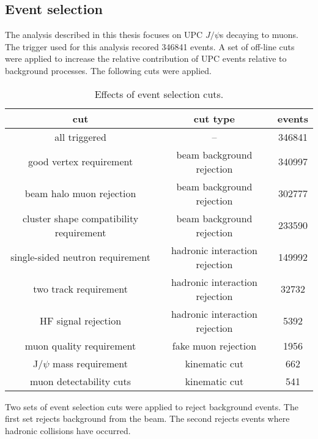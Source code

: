     \subsection{Event selection}
      The analysis described in this thesis focuses on UPC $J/\psi$s decaying to 
        muons. 
      The trigger used for this analysis recored 346841 events.
      A set of off-line cuts were applied to increase the relative contribution 
        of UPC events relative to background processes. 
      The following cuts were applied. 
 
      \begin{table}
        \centering
        \begin{tabular}{|c|c|c|} \hline 
          cut & cut type & events \\ \hline
          all triggered & -- & 346841 \\ \hline
          good vertex requirement & beam background rejection & 340997 \\ \hline
          beam halo muon rejection & beam background rejection & 302777 \\ \hline
          cluster shape compatibility requirement & beam background rejection & 233590 \\ \hline
          single-sided neutron requirement & hadronic interaction rejection & 149992 \\ \hline
          two track requirement & hadronic interaction rejection & 32732 \\ \hline
          HF signal rejection & hadronic interaction rejection & 5392 \\ \hline
          muon quality requirement & fake muon rejection & 1956\\ \hline
          J/$\psi$ mass requirement & kinematic cut & 662 \\ \hline
          muon detectability cuts & kinematic cut & 541 \\ \hline
        \end{tabular}
        \caption{Effects of event selection cuts.}
        \label{tab:evSelCutNumbers}
      \end{table}

      Two sets of event selection cuts were applied to reject background events. 
      The first set rejects background from the beam.
      The second rejects events where hadronic collisions have occurred.
      

